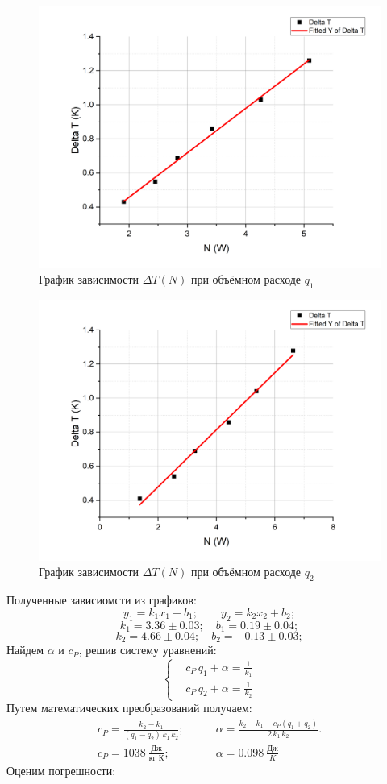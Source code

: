 \documentclass[a4paper, 12pt]{article}%
\begin{document}
\begin{figure}
\center
\includegraphics[scale=0.4]{labphoto29.png}
\caption{График зависимости $\Delta T(N)$ при объёмном расходе $q_1$}
\end{figure}

\begin{figure}
\center
\includegraphics[scale=0.4]{labphoto30.png}
\caption{График зависимости $\Delta T(N)$ при объёмном расходе $q_2$}
\end{figure}
\newpage
Полученные зависиомсти из графиков:
\[
y_1 =k_1 x_1 + b_1;\qquad y_2 = k_2 x_2 + b_2;
\]
\[
k_1 = 3.36 \pm 0.03; \quad b_ 1 = 0.19 \pm 0.04; 
\]
\[ 
k_2 = 4.66 \pm 0.04; \quad b_ 2 = - 0.13 \pm 0.03;
\]
Найдем $\alpha$ и $c_P$, решив систему уравнений:
\[
	\left\{
		\begin{aligned}
			& c_P\, q_1 + \alpha = \frac{1}{k_1} \\
			& c_P\, q_2 + \alpha = \frac{1}{k_2}
		\end{aligned}
	\right.
\]
Путем математических преобразований получаем:
\[
\begin{aligned}
	 c_P = \frac{k_2 - k_1}{(q_1 - q_2)\, k_1\, k_2}; & \qquad  \alpha = \frac{k_2-k_1-c_P(q_1+q_2)}{2\,k_1\,k_2}. \\
	 c_P = 1038\ \frac{\text{Дж}}{\text{кг К}}; & \qquad  \alpha = 0.098\ \frac{\text{Дж}}{K} 
\end{aligned}
\]
Оценим погрешности:
\end{document}

